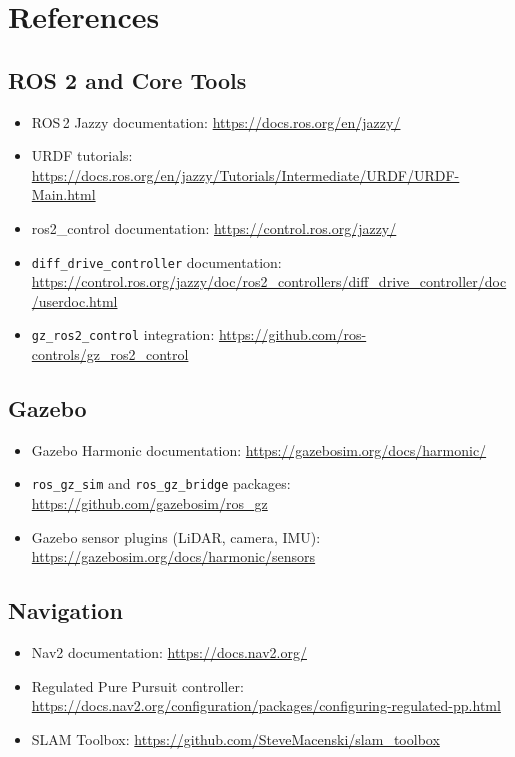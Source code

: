 \documentclass[12pt, a4paper]{article}
\begin{document}
\newpage
\section{References}

\subsection{ROS 2 and Core Tools}
\begin{itemize}
    \item ROS\,2 Jazzy documentation: \url{https://docs.ros.org/en/jazzy/}
    \item URDF tutorials: \url{https://docs.ros.org/en/jazzy/Tutorials/Intermediate/URDF/URDF-Main.html}
    \item ros2\_control documentation: \url{https://control.ros.org/jazzy/}
    \item \texttt{diff\_drive\_controller} documentation: \url{https://control.ros.org/jazzy/doc/ros2_controllers/diff_drive_controller/doc/userdoc.html}
    \item \texttt{gz\_ros2\_control} integration: \url{https://github.com/ros-controls/gz_ros2_control}
\end{itemize}

\subsection{Gazebo}
\begin{itemize}
    \item Gazebo Harmonic documentation: \url{https://gazebosim.org/docs/harmonic/}
    \item \texttt{ros\_gz\_sim} and \texttt{ros\_gz\_bridge} packages: \url{https://github.com/gazebosim/ros_gz}
    \item Gazebo sensor plugins (LiDAR, camera, IMU): \url{https://gazebosim.org/docs/harmonic/sensors}
\end{itemize}

\subsection{Navigation}
\begin{itemize}
    \item Nav2 documentation: \url{https://docs.nav2.org/}
    \item Regulated Pure Pursuit controller: \url{https://docs.nav2.org/configuration/packages/configuring-regulated-pp.html}
    \item SLAM Toolbox: \url{https://github.com/SteveMacenski/slam_toolbox}
\end{itemize}
\end{document}
